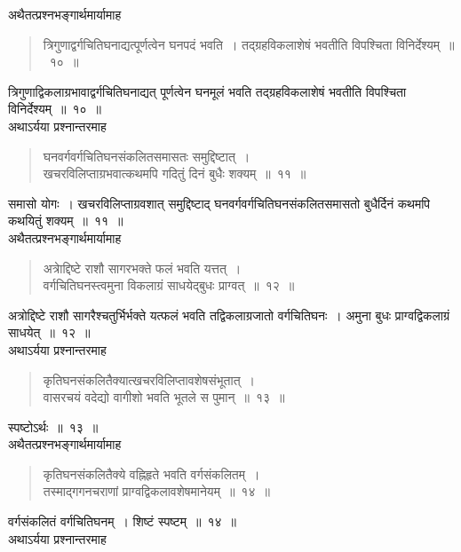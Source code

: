 \documentclass[11pt, openany]{book}
\begin{document}
\indent
अथैतत्प्रश्नभङ्गार्थमार्यामाह\textendash
\begin{quote}
{\ks त्रिगुणाद्वर्गचितिघनाद्यत्पूर्णत्वेन घनपदं भवति~।
तद्ग्रहविकलाशेषं भवतीति विपश्चिता विनिर्देश्यम्~॥~१०~॥}
\end{quote}
\indent
त्रिगुणाद्विकलाग्रभावाद्वर्गचितिघनाद्यत् पूर्णत्वेन घनमूलं भवति तद्ग्रहविकलाशेषं भवतीति विपश्चिता विनिर्देश्यम्~॥~१०~॥\\

\indent
अथाऽर्यया प्रश्नान्तरमाह\textendash
\begin{quote}
{\ks घनवर्गवर्गचितिघनसंकलितसमासतः समुद्दिष्टात्~।\\
खचरविलिप्ताग्रभवात्कथमपि गदितुं दिनं बुधैः शक्यम्~॥~११~॥}
\end{quote}
\indent
समासो योगः~। खचरविलिप्ताग्रवशात् समुद्दिष्टाद् घनवर्गवर्गचितिघनसंकलितसमासतो बुधैर्दिनं कथमपि कथयितुं शक्यम्~॥~११~॥\\

अथैतत्प्रश्नभङ्गार्थमार्यामाह\textendash
\begin{quote}
{\ks अत्राेद्दिष्टे राशौ सागरभक्ते फलं भवति यत्तत्~।\\
वर्गचितिघनस्त्वमुना विकलाग्रं साधयेद्बुधः प्राग्वत्~॥~१२~॥}
\end{quote}
\indent
अत्रोद्दिष्टे राशौ सागरैश्चतुर्भिर्भक्ते यत्फलं भवति तद्विकलाग्रजातो वर्गचितिघनः~। अमुना बुधः प्राग्वद्विकलाग्रं साधयेत्~॥~१२~॥\\

\indent
अथाऽर्यया प्रश्नान्तरमाह\textendash
\begin{quote}
{\ks कृतिघनसंकलितैक्यात्खचरविलिप्तावशेषसंभूतात्~।\\
वासरचयं वदेद्यो वागीशो भवति भूतले स पुमान्~॥~१३~॥}
\end{quote}
\indent
स्पष्टोऽर्थः~॥~१३~॥\\

\indent
अथैतत्प्रश्नभङ्गार्थमार्यामाह\textendash
\begin{quote}
{\ks कृतिघनसंकलितैक्ये वह्निहृते भवति वर्गसंकलितम्~।\\
तस्माद्गगनचराणां प्राग्वद्विकलावशेषमानेयम्~॥~१४~॥}\\
\end{quote}

\newpage
\thispagestyle{fancy}
\fancyhf{}

\indent
वर्गसंकलितं वर्गचितिघनम्~। शिष्टं स्पष्टम्~॥~१४~॥\\

\indent
अथाऽर्यया प्रश्नान्तरमाह\textendash
\end{document}
